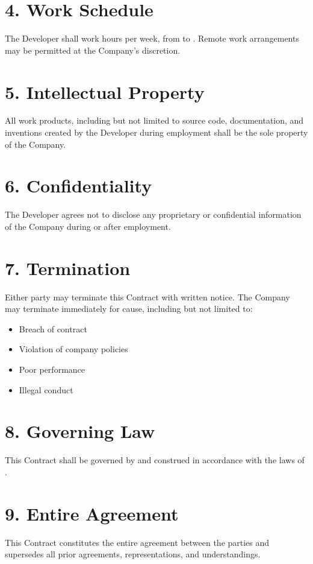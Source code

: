 \documentclass[12pt]{ctexart}
\begin{document}
\section*{4. Work Schedule}
The Developer shall work \underline{\hspace{2cm}} hours per week, from \underline{\hspace{2cm}} to \underline{\hspace{2cm}}. Remote work arrangements may be permitted at the Company's discretion.

\section*{5. Intellectual Property}
All work products, including but not limited to source code, documentation, and inventions created by the Developer during employment shall be the sole property of the Company.

\section*{6. Confidentiality}
The Developer agrees not to disclose any proprietary or confidential information of the Company during or after employment.

\section*{7. Termination}
Either party may terminate this Contract with written notice. The Company may terminate immediately for cause, including but not limited to:
\begin{itemize}[leftmargin=*]
    \item Breach of contract
    \item Violation of company policies
    \item Poor performance
    \item Illegal conduct
\end{itemize}

\section*{8. Governing Law}
This Contract shall be governed by and construed in accordance with the laws of \underline{\hspace{4cm}}.

\section*{9. Entire Agreement}
This Contract constitutes the entire agreement between the parties and supersedes all prior agreements, representations, and understandings.
\end{document}
